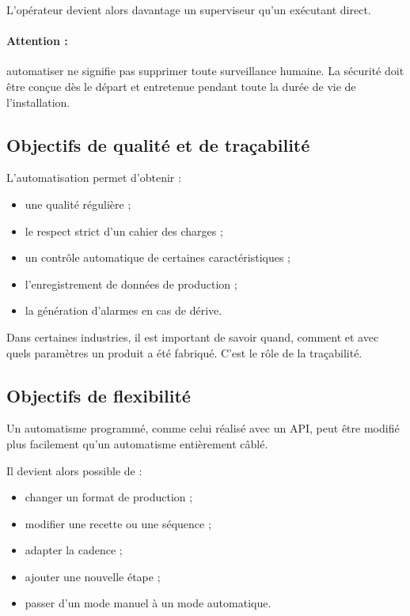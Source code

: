 L'opérateur devient alors davantage un superviseur qu'un exécutant direct.

\paragraph{Attention :} automatiser ne signifie pas supprimer toute surveillance humaine. La sécurité doit être conçue dès le départ et entretenue pendant toute la durée de vie de l'installation.

\subsection{Objectifs de qualité et de traçabilité}

L'automatisation permet d'obtenir :

\begin{itemize}
    \item une qualité régulière ;
    \item le respect strict d'un cahier des charges ;
    \item un contrôle automatique de certaines caractéristiques ;
    \item l'enregistrement de données de production ;
    \item la génération d'alarmes en cas de dérive.
\end{itemize}

Dans certaines industries, il est important de savoir quand, comment et avec quels paramètres un produit a été fabriqué. C'est le rôle de la traçabilité.

\subsection{Objectifs de flexibilité}

Un automatisme programmé, comme celui réalisé avec un API, peut être modifié plus facilement qu'un automatisme entièrement câblé.

Il devient alors possible de :

\begin{itemize}
    \item changer un format de production ;
    \item modifier une recette ou une séquence ;
    \item adapter la cadence ;
    \item ajouter une nouvelle étape ;
    \item passer d'un mode manuel à un mode automatique.
\end{itemize}

